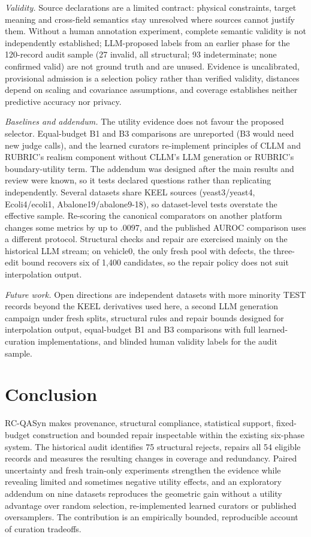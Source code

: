 \textit{Validity.} Source declarations are a limited contract: physical constraints, target meaning and cross-field semantics stay unresolved where sources cannot justify them. Without a human annotation experiment, complete semantic validity is not independently established; LLM-proposed labels from an earlier phase for the 120-record audit sample (27 invalid, all structural; 93 indeterminate; none confirmed valid) are not ground truth and are unused. Evidence is uncalibrated, provisional admission is a selection policy rather than verified validity, distances depend on scaling and covariance assumptions, and coverage establishes neither predictive accuracy nor privacy.

\textit{Baselines and addendum.} The utility evidence does not favour the proposed selector. Equal-budget B1 and B3 comparisons are unreported (B3 would need new judge calls), and the learned curators re-implement principles of CLLM and RUBRIC's realism component without CLLM's LLM generation or RUBRIC's boundary-utility term. The addendum was designed after the main results and review were known, so it tests declared questions rather than replicating independently. Several datasets share KEEL sources (yeast3/yeast4, Ecoli4/ecoli1, Abalone19/abalone9-18), so dataset-level tests overstate the effective sample. Re-scoring the canonical comparators on another platform changes some metrics by up to $.0097$, and the published AUROC comparison uses a different protocol. Structural checks and repair are exercised mainly on the historical LLM stream; on vehicle0, the only fresh pool with defects, the three-edit bound recovers six of 1{,}400 candidates, so the repair policy does not suit interpolation output.

\textit{Future work.} Open directions are independent datasets with more minority TEST records beyond the KEEL derivatives used here, a second LLM generation campaign under fresh splits, structural rules and repair bounds designed for interpolation output, equal-budget B1 and B3 comparisons with full learned-curation implementations, and blinded human validity labels for the audit sample.

\section{Conclusion}
RC-QASyn makes provenance, structural compliance, statistical support, fixed-budget construction and bounded repair inspectable within the existing six-phase system. The historical audit identifies 75 structural rejects, repairs all 54 eligible records and measures the resulting changes in coverage and redundancy. Paired uncertainty and fresh train-only experiments strengthen the evidence while revealing limited and sometimes negative utility effects, and an exploratory addendum on nine datasets reproduces the geometric gain without a utility advantage over random selection, re-implemented learned curators or published oversamplers. The contribution is an empirically bounded, reproducible account of curation tradeoffs.
